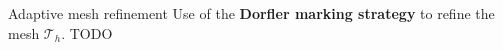 
\begin{appendixframe}{Adaptive mesh refinement}
	Use of the \textbf{Dorfler marking strategy} to refine the mesh $\mathcal{T}_h$. \citep{dorfler_1996}
	TODO
\end{appendixframe}